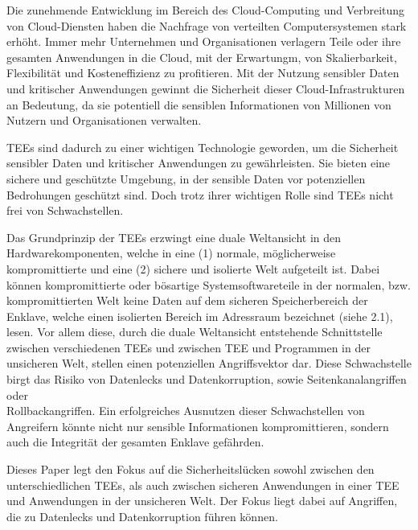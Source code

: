 Die zunehmende Entwicklung im Bereich des Cloud-Computing und Verbreitung von Cloud-Diensten haben die Nachfrage von verteilten Computersystemen stark erhöht. 
Immer mehr Unternehmen und Organisationen verlagern Teile oder ihre gesamten Anwendungen in die Cloud, mit der Erwartungm, von Skalierbarkeit, Flexibilität und Kosteneffizienz zu profitieren\cite{Cloud}. 
Mit der Nutzung sensibler Daten und kritischer Anwendungen gewinnt die Sicherheit dieser Cloud-Infrastrukturen an Bedeutung, da sie potentiell die sensiblen Informationen von Millionen von Nutzern und Organisationen verwalten.

TEEs sind dadurch zu einer wichtigen Technologie geworden, um die Sicherheit sensibler Daten und kritischer Anwendungen zu gewährleisten. 
Sie bieten eine sichere und geschützte Umgebung, in der sensible Daten vor potenziellen Bedrohungen geschützt sind. Doch trotz ihrer wichtigen Rolle sind TEEs nicht frei von Schwachstellen. 

Das Grundprinzip der TEEs erzwingt eine duale Weltansicht in den Hardwarekomponenten, welche in eine (1) normale, möglicherweise kompromittierte und eine (2) sichere und isolierte Welt aufgeteilt ist\cite{TEEPaper}. 
Dabei können kompromittierte oder bösartige Systemsoftwareteile in der normalen, bzw. kompromittierten Welt keine Daten auf dem sicheren Speicherbereich der Enklave, welche einen isolierten Bereich im Adressraum bezeichnet (siehe 2.1), lesen. Vor allem diese, durch die duale Weltansicht entstehende Schnittstelle zwischen verschiedenen TEEs und zwischen TEE und Programmen in der unsicheren Welt, stellen einen potenziellen Angriffsvektor dar.
Diese Schwachstelle birgt das Risiko von Datenlecks und Datenkorruption, sowie Seitenkanalangriffen oder\\ Rollbackangriffen\cite{Memory, TEEPaper}. Ein erfolgreiches Ausnutzen dieser Schwachstellen von Angreifern könnte nicht nur sensible Informationen kompromittieren, sondern auch die Integrität der gesamten Enklave gefährden. 

Dieses Paper legt den Fokus auf die Sicherheitslücken sowohl zwischen den unterschiedlichen TEEs, als auch zwischen sicheren Anwendungen in einer TEE und Anwendungen in der unsicheren Welt. Der Fokus liegt dabei auf Angriffen, die zu Datenlecks und Datenkorruption führen können.
